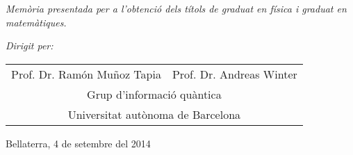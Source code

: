 \begin{center}
\hrulefill
\end{center}
\vspace{1cm}
\maketitle
\begin{center}
\hrulefill
\end{center}
\begin{center}
\vspace{1cm}
\begin{minipage}{.7\textwidth}
\centering
\textit{Mem\`{o}ria presentada per a l'obtenci\'{o} dels t\'{i}tols de graduat en f\'{i}sica i graduat en matem\`{a}tiques.}
\end{minipage}
\end{center}
\vspace{3cm}
\begin{center}
 \textit{Dirigit per:}\\
\begin{tabular}{ll}
\sc Prof. Dr. Ram\'{o}n Mu\~{n}oz Tapia & \sc Prof. Dr. Andreas Winter\\
\multicolumn{2}{c}{Grup d'informaci\'{o} qu\`{a}ntica}\\
\multicolumn{2}{c}{Universitat aut\`{o}noma de Barcelona}
\end{tabular}
\end{center}
\vfill
\begin{center}
Bellaterra, 4 de setembre del 2014
\end{center}
\thispagestyle{empty}

\newpage
\setcounter{page}{0} 

\thispagestyle{empty}
\tableofcontents

\newpage